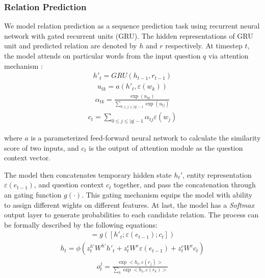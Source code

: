 
\subsubsection{Relation Prediction} We model relation prediction as a sequence prediction task using recurrent neural network with gated recurrent units (GRU). The hidden representations of GRU unit and predicted relation are denoted by $h$ and $r$ respectively. At timestep $t$, the model attends on particular words from the input question $q$ via attention mechanism \cite{DBLP:journals/corr/BahdanauCB14}:
\begin{align}
h'_{t} = GRU(h_{t-1}, r_{t-1}) 
\end{align}
\vspace{-3ex}
\begin{align}
u_{tk} = a(h'_{t},\varepsilon(w_k))
\end{align}
\vspace{-3ex}
\begin{align}
\alpha_{tk} = \frac{\exp (u_{tk})}{\sum_{0\leq j\leq |q|-1}\exp (u_{tj})}
\end{align}
\vspace{-1ex}
\begin{align}
c_t = \sum_{0\leq j\leq |q|-1}\alpha_{tj}\varepsilon(w_j)
\end{align}

where $a$ is a parameterized feed-forward neural network to calculate the similarity score of two inputs, and $c_t$ is the output of attention module as the question context vector. %

The model then concatenates temporary hidden state $h_{t}'$, entity representation $\varepsilon(e_{t-1})$, and question context $c_t$ together, and pass the concatenation through an gating function $g(\cdot)$. This gating mechanism equips the model with ability to assign different wights on different features. At last, the model has a \textit{Softmax} output layer to generate probabilities to each candidate relation.  The process can be formally described by the following equations:
\begin{align}
[z_t^{h'}, z_t^{e}, z_t^{c}] = g([h'_{t}; \varepsilon(e_{t-1}); c_t])
\end{align}
\vspace{-2ex}
\begin{align}
h_{t} = \phi(z^{h'}_tW^{h'}h'_{t}+z^{e}_t W^{e}\varepsilon(e_{t-1})+z^{c}_t W^{c}c_{t})
\end{align}
\vspace{-2ex}
\begin{align}
o^j_t = \frac{\exp <h_t,\varepsilon(r_j)>}{\sum_k\exp <h_t,\varepsilon(r_k)>}
\label{eq:r_prob}
\end{align}

